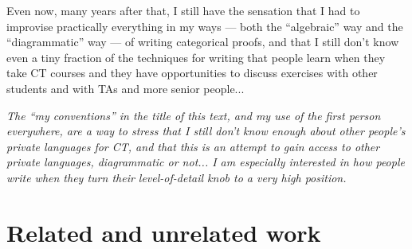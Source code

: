\documentclass[oneside,12pt]{article}
\begin{document}
Even now, many years after that, I still have the sensation that I had
to improvise practically everything in my ways --- both the
``algebraic'' way and the ``diagrammatic'' way --- of writing
categorical proofs, and that I still don't know even a tiny fraction
of the techniques for writing that people learn when they take CT
courses and they have opportunities to discuss exercises with other
students and with TAs and more senior people...

\msk

{\sl The ``my conventions'' in the title of this text, and my use of
  the first person everywhere, are a way to stress that I still don't
  know enough about other people's private languages for CT, and that
  this is an attempt to gain access to other private languages,
  diagrammatic or not... I am especially interested in how people
  write when they turn their level-of-detail knob to a very high
  position.}





%                                                            
\section{Related and unrelated work \DONE}
\label{related-and-unrelated}

\end{document}
